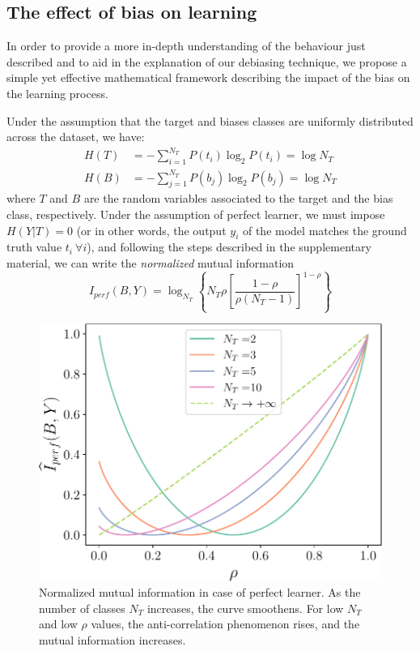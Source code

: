 \subsection{The effect of bias on learning}
\label{sec:bias-theoretical-model}
In order to provide a more in-depth understanding of the behaviour just described and to aid in the explanation of our debiasing technique, we propose a simple yet effective mathematical framework describing the impact of the bias on the learning process. 

Under the assumption that the target and biases classes are uniformly distributed across the dataset, we have:
\begin{align}
	H(T) &= -\sum_{i=1}^{N_T} P(t_i) \log_2 P(t_i) = \log N_T \nonumber \\
	H(B) &= -\sum_{j=1}^{N_T} P(b_j) \log_2 P(b_j) = \log N_T \label{eq:entropy_assumption}
\end{align}
where $T$ and $B$ are the random variables associated to the target and the bias class, respectively. Under the assumption of perfect learner, we must impose
   $H(Y|T) = 0$
(or in other words, the output $y_i$ of the model matches the ground truth value $t_i~\forall i$), and following the steps described in the supplementary material, %
we can write the \emph{normalized} mutual information
\begin{equation}
    \label{eq:MI_perfect}
	\widehat{I}_{perf}(B, Y) =  \log_{N_T}\left\{N_T\rho\left[\frac{1-\rho}{\rho(N_T-1)}\right]^{1-\rho}\right\}
\end{equation}
\begin{figure}
    \centering
    \includegraphics[width=\columnwidth]{img/MI_YZ.pdf}
    \caption{Normalized mutual information in case of perfect learner. As the number of classes $N_T$ increases, the curve smoothens. For low $N_T$ and low $\rho$ values, the anti-correlation phenomenon rises, and the mutual information increases.}
    \label{fig:MI_YZ}
\end{figure}
